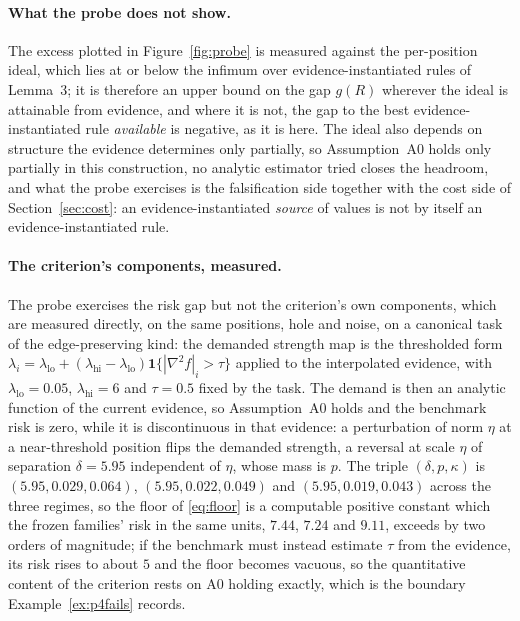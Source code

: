 \paragraph{What the probe does not show.} The excess plotted in Figure~\ref{fig:probe} is measured against the per-position ideal, which lies at or below the infimum over evidence-instantiated rules of Lemma~3; it is therefore an upper bound on the gap $g(R)$ wherever the ideal is attainable from evidence, and where it is not, the gap to the best evidence-instantiated rule \emph{available} is negative, as it is here. The ideal also depends on structure the evidence determines only partially, so Assumption~A0 holds only partially in this construction, no analytic estimator tried closes the headroom, and what the probe exercises is the falsification side together with the cost side of Section~\ref{sec:cost}: an evidence-instantiated \emph{source} of values is not by itself an evidence-instantiated rule.

\paragraph{The criterion's components, measured.} The probe exercises the risk gap but not the criterion's own components, which are measured directly, on the same positions, hole and noise, on a canonical task of the edge-preserving kind: the demanded strength map is the thresholded form $\lambda_i = \lambda_{\mathrm{lo}} + (\lambda_{\mathrm{hi}} - \lambda_{\mathrm{lo}}) \mathbf{1}\{ |\nabla^2 f|_i > \tau \}$ applied to the interpolated evidence, with $\lambda_{\mathrm{lo}} = 0.05$, $\lambda_{\mathrm{hi}} = 6$ and $\tau = 0.5$ fixed by the task. The demand is then an analytic function of the current evidence, so Assumption~A0 holds and the benchmark risk is zero, while it is discontinuous in that evidence: a perturbation of norm $\eta$ at a near-threshold position flips the demanded strength, a reversal at scale $\eta$ of separation $\delta = 5.95$ independent of $\eta$, whose mass is $p$. The triple $(\delta, p, \kappa)$ is $(5.95, 0.029, 0.064)$, $(5.95, 0.022, 0.049)$ and $(5.95, 0.019, 0.043)$ across the three regimes, so the floor of \eqref{eq:floor} is a computable positive constant which the frozen families' risk in the same units, $7.44$, $7.24$ and $9.11$, exceeds by two orders of magnitude; if the benchmark must instead estimate $\tau$ from the evidence, its risk rises to about $5$ and the floor becomes vacuous, so the quantitative content of the criterion rests on A0 holding exactly, which is the boundary Example~\ref{ex:p4fails} records.

